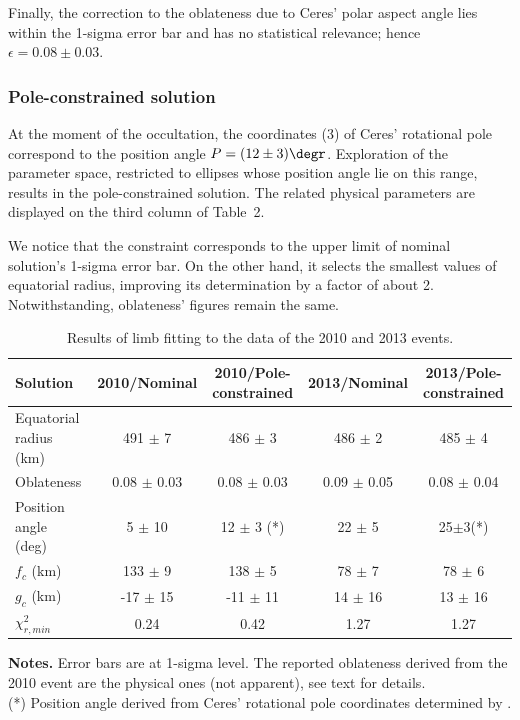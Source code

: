 \documentclass[useAMS,usenatbib]{mn2e}
\begin{document}
Finally, the correction to the oblateness due to Ceres' polar aspect angle lies within the 1-sigma error bar and has no statistical relevance; hence $\epsilon = 0.08 \pm 0.03$.





\subsubsection{Pole-constrained solution}

At the moment of the occultation, the coordinates (3) of Ceres' rotational pole correspond to the position angle $P = (12 \pm 3)\degr$. Exploration of the parameter space, restricted to ellipses whose position angle lie on this range, results in the pole-constrained solution. The related physical parameters are displayed on the third column of Table~2.

We notice that the constraint corresponds to the upper limit of nominal solution's 1-sigma error bar. On the other hand, it selects the smallest values of equatorial radius, improving its determination by a factor of about 2. Notwithstanding, oblateness' figures remain the same.

\begin{table}
 \centering
 \begin{minipage}{140mm}
  \caption{Results of limb fitting to the data of the 2010 and 2013 events.}
  \begin{tabular}{@{}lcccc}
  \hline
     Solution & 2010/Nominal & 2010/Pole-constrained & 2013/Nominal & 2013/Pole-constrained \\
\hline
Equatorial radius (km) & 491 $\pm$ 7   & 486 $\pm$ 3   & 486 $\pm$ 2   & 485 $\pm$ 4\\
Oblateness             & 0.08 $\pm$ 0.03 & 0.08 $\pm$ 0.03 & 0.09 $\pm$ 0.05 & 0.08 $\pm$ 0.04\\
Position angle (deg)   & 5 $\pm$ 10    & 12 $\pm$ 3 (*)& 22 $\pm$ 5    &  25$\pm$3(*)\\
$f_c$ (km)             & 133 $\pm$ 9   & 138 $\pm$ 5   & 78 $\pm$ 7    & 78 $\pm$ 6\\
$g_c$ (km)             & -17 $\pm$ 15  & -11 $\pm$ 11  & 14 $\pm$ 16   & 13 $\pm$ 16\\
$\chi^2_{r,min}$       & 0.24          &  0.42         & 1.27          & 1.27\\
\hline
\end{tabular}
\textbf{Notes.} Error bars are at 1-sigma level. The reported oblateness derived from the 2010 event are the physical ones (not apparent), see text for details. \\
(*) Position angle derived from Ceres' rotational pole coordinates determined by \cite{Drummond2014}.
\end{minipage}
\end{table}
\end{document}
